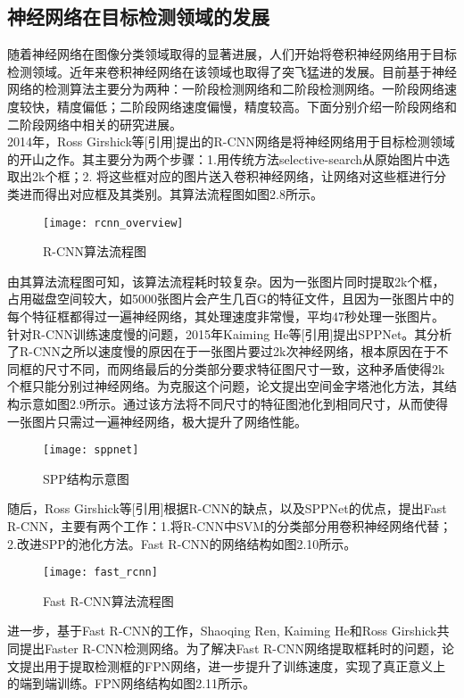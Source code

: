 \subsection{神经网络在目标检测领域的发展}
随着神经网络在图像分类领域取得的显著进展，人们开始将卷积神经网络用于目标检测领域。近年来卷积神经网络在该领域也取得了突飞猛进的发展。目前基于神经网络的检测算法主要分为两种：一阶段检测网络和二阶段检测网络。一阶段网络速度较快，精度偏低；二阶段网络速度偏慢，精度较高。下面分别介绍一阶段网络和二阶段网络中相关的研究进展。\\
2014年，Ross Girshick等[引用]提出的R-CNN网络是将神经网络用于目标检测领域的开山之作。其主要分为两个步骤：1.用传统方法selective-search从原始图片中选取出2k个框；2. 将这些框对应的图片送入卷积神经网络，让网络对这些框进行分类进而得出对应框及其类别。其算法流程图如图2.8所示。\\
\begin{figure}[htp]
\centering
\texttt{[image: rcnn\_overview]}
\caption{R-CNN算法流程图}
\end{figure}
由其算法流程图可知，该算法流程耗时较复杂。因为一张图片同时提取2k个框，占用磁盘空间较大，如5000张图片会产生几百G的特征文件，且因为一张图片中的每个特征框都得过一遍神经网络，其处理速度非常慢，平均47秒处理一张图片。\\
针对R-CNN训练速度慢的问题，2015年Kaiming He等[引用]提出SPPNet。其分析了R-CNN之所以速度慢的原因在于一张图片要过2k次神经网络，根本原因在于不同框的尺寸不同，而网络最后的分类部分要求特征图尺寸一致，这种矛盾使得2k个框只能分别过神经网络。为克服这个问题，论文提出空间金字塔池化方法，其结构示意如图2.9所示。通过该方法将不同尺寸的特征图池化到相同尺寸，从而使得一张图片只需过一遍神经网络，极大提升了网络性能。\\
\begin{figure}[htp]
\centering
\texttt{[image: sppnet]}
\caption{SPP结构示意图}
\end{figure}
随后，Ross Girshick等[引用]根据R-CNN的缺点，以及SPPNet的优点，提出Fast R-CNN，主要有两个工作：1.将R-CNN中SVM的分类部分用卷积神经网络代替；2.改进SPP的池化方法。Fast R-CNN的网络结构如图2.10所示。\\
\begin{figure}[htp]
\centering
\texttt{[image: fast\_rcnn]}
\caption{Fast R-CNN算法流程图}
\end{figure}
进一步，基于Fast R-CNN的工作，Shaoqing Ren, Kaiming He和Ross Girshick共同提出Faster R-CNN检测网络。为了解决Fast R-CNN网络提取框耗时的问题，论文提出用于提取检测框的FPN网络，进一步提升了训练速度，实现了真正意义上的端到端训练。FPN网络结构如图2.11所示。\\
